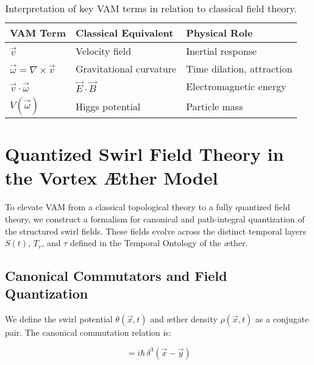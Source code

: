 \documentclass[12pt]{article}
\begin{document}
    \begin{table}[H]
        \centering
        \renewcommand{\arraystretch}{1.3}
        \begin{tabular}{|l|l|l|}
            \hline
            \textbf{VAM Term} & \textbf{Classical Equivalent} & \textbf{Physical Role} \\
            \hline
            \( \vec{v} \) & Velocity field & Inertial response \\
            \( \vec{\omega} = \nabla \times \vec{v} \) & Gravitational curvature & Time dilation, attraction \\
            \( \vec{v} \cdot \vec{\omega} \) & \( \vec{E} \cdot \vec{B} \) & Electromagnetic energy \\
            \( V(\vec{\omega}) \) & Higgs potential & Particle mass \\
            \hline
        \end{tabular}
        \caption{Interpretation of key VAM terms in relation to classical field theory.}
        \label{tab:vam_classical_mapping}
    \end{table}


\section{Quantized Swirl Field Theory in the Vortex \AE{}ther Model}\label{sec:quantized_swirl_field_theory}

    To elevate VAM from a classical topological theory to a fully quantized field theory, we construct a formalism for canonical and path-integral quantization of the structured swirl fields. These fields evolve across the distinct temporal layers \( S(t) \), \( T_v \), and \( \tau \) defined in the Temporal Ontology of the æther.

    \subsection{Canonical Commutators and Field Quantization}

    We define the swirl potential \( \theta(\vec{x}, t) \) and æther density \( \rho(\vec{x}, t) \) as a conjugate pair. The canonical commutation relation is:

    \begin{equation}
    [\theta(\vec{x}), \rho(\vec{y})] = i\hbar\,\delta^3(\vec{x} - \vec{y})
    \label{eq:canonical_commutator}
    \end{equation}
\end{document}
